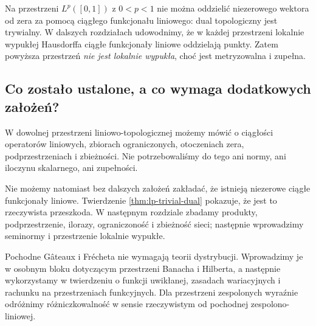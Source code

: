 \begin{uwaga}\label{rem:local-convexity-purpose}
Na przestrzeni $L^p([0,1])$ z $0<p<1$ nie można oddzielić
niezerowego wektora od zera za pomocą ciągłego funkcjonału
liniowego: dual topologiczny jest trywialny. W dalszych
rozdziałach udowodnimy, że w każdej przestrzeni lokalnie
wypukłej Hausdorffa ciągłe funkcjonały liniowe oddzielają
punkty. Zatem powyższa przestrzeń \emph{nie jest lokalnie wypukła},
choć jest metryzowalna i zupełna.
\end{uwaga}

\subsection{Co zostało ustalone, a co wymaga dodatkowych założeń?}

W dowolnej przestrzeni liniowo-topologicznej możemy mówić o
ciągłości operatorów liniowych, zbiorach ograniczonych, otoczeniach
zera, podprzestrzeniach i zbieżności. Nie potrzebowaliśmy do tego
ani normy, ani iloczynu skalarnego, ani zupełności.

Nie możemy natomiast bez dalszych założeń zakładać, że istnieją
niezerowe ciągłe funkcjonały liniowe. Twierdzenie
\ref{thm:lp-trivial-dual} pokazuje, że jest to rzeczywista
przeszkoda. W następnym rozdziale zbadamy produkty, podprzestrzenie,
ilorazy, ograniczoność i zbieżność sieci; następnie wprowadzimy
seminormy i przestrzenie lokalnie wypukłe.

\begin{uwaga}
Pochodne Gâteaux i Frécheta nie wymagają teorii dystrybucji.
Wprowadzimy je w osobnym bloku dotyczącym przestrzeni Banacha
i Hilberta, a następnie wykorzystamy w twierdzeniu o funkcji
uwikłanej, zasadach wariacyjnych i rachunku na przestrzeniach
funkcyjnych. Dla przestrzeni zespolonych wyraźnie odróżnimy
różniczkowalność w sensie rzeczywistym od pochodnej
zespolono-liniowej.
\end{uwaga}

